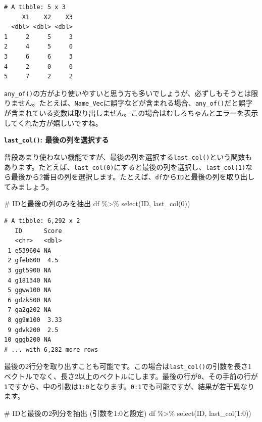 \documentclass[
  a4paper,
  pandoc,
  ja=standard,
  jafont=haranoaji]{bxjsbook}
\newenvironment{Shaded}{\begin{snugshade}}{\end{snugshade}}
\newcommand{\CommentTok}[1]{\textcolor[rgb]{0.37,0.37,0.37}{#1}}
\newcommand{\DecValTok}[1]{\textcolor[rgb]{0.68,0.00,0.00}{#1}}
\newcommand{\FunctionTok}[1]{\textcolor[rgb]{0.28,0.35,0.67}{#1}}
\newcommand{\NormalTok}[1]{\textcolor[rgb]{0.00,0.48,0.65}{#1}}
\newcommand{\SpecialCharTok}[1]{\textcolor[rgb]{0.37,0.37,0.37}{#1}}
\begin{document}
\begin{verbatim}
# A tibble: 5 x 3
     X1    X2    X3
  <dbl> <dbl> <dbl>
1     2     5     3
2     4     5     0
3     6     6     3
4     2     0     0
5     7     2     2
\end{verbatim}

\texttt{any\_of()}の方がより使いやすいと思う方も多いでしょうが、必ずしもそうとは限りません。たとえば、\texttt{Name\_Vec}に誤字などが含まれる場合、\texttt{any\_of()}だと誤字が含まれている変数は取り出しません。この場合はむしろちゃんとエラーを表示してくれた方が嬉しいですね。

\textbf{\texttt{last\_col()}: 最後の列を選択する}

普段あまり使わない機能ですが、最後の列を選択する\texttt{last\_col()}という関数もあります。たとえば、\texttt{last\_col(0)}にすると最後の列を選択し、\texttt{last\_col(1)}なら最後から2番目の列を選択します。たとえば、\texttt{df}から\texttt{ID}と最後の列を取り出してみましょう。

\begin{Shaded}
\begin{Highlighting}[numbers=left,,]
\CommentTok{\# IDと最後の列のみを抽出}
\NormalTok{df }\SpecialCharTok{\%\textgreater{}\%}
  \FunctionTok{select}\NormalTok{(ID, }\FunctionTok{last\_col}\NormalTok{(}\DecValTok{0}\NormalTok{))}
\end{Highlighting}
\end{Shaded}

\begin{verbatim}
# A tibble: 6,292 x 2
   ID      Score
   <chr>   <dbl>
 1 e539604 NA   
 2 gfeb600  4.5 
 3 ggt5900 NA   
 4 g181340 NA   
 5 ggww100 NA   
 6 gdzk500 NA   
 7 ga2g202 NA   
 8 gg9m100  3.33
 9 gdvk200  2.5 
10 gggb200 NA   
# ... with 6,282 more rows
\end{verbatim}

最後の2行分を取り出すことも可能です。この場合は\texttt{last\_col()}の引数を長さ1ベクトルでなく、長さ2以上のベクトルにします。最後の行が\texttt{0}、その手前の行が\texttt{1}ですから、中の引数は\texttt{1:0}となります。\texttt{0:1}でも可能ですが、結果が若干異なります。

\begin{Shaded}
\begin{Highlighting}[numbers=left,,]
\CommentTok{\# IDと最後の2列分を抽出 (引数を1:0と設定)}
\NormalTok{df }\SpecialCharTok{\%\textgreater{}\%}
  \FunctionTok{select}\NormalTok{(ID, }\FunctionTok{last\_col}\NormalTok{(}\DecValTok{1}\SpecialCharTok{:}\DecValTok{0}\NormalTok{))}
\end{Highlighting}
\end{Shaded}
\end{document}
